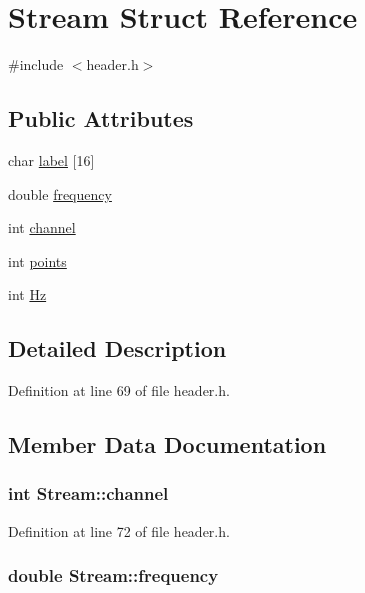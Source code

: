 \hypertarget{structStream}{
\section{Stream Struct Reference}
\label{structStream}
}


{\ttfamily \#include $<$header.h$>$}\subsection*{Public Attributes}
\begin{DoxyCompactItemize}
\item 
char \hyperlink{structStream_af1b6aba00738fd5e20cd47a94ba0386b}{label} \mbox{[}16\mbox{]}
\item 
double \hyperlink{structStream_a4c352f851b0089c569024725a3860e79}{frequency}
\item 
int \hyperlink{structStream_a3e3d54add259a7f6f9ab58e02c7cff72}{channel}
\item 
int \hyperlink{structStream_a02a8da4ea08d8e4784dc5c90f1d87282}{points}
\item 
int \hyperlink{structStream_af36be19d9f235d1f9d9ba5da9db58ae8}{Hz}
\end{DoxyCompactItemize}


\subsection{Detailed Description}


Definition at line 69 of file header.h.

\subsection{Member Data Documentation}
\hypertarget{structStream_a3e3d54add259a7f6f9ab58e02c7cff72}{
\subsubsection[{channel}]{\setlength{\rightskip}{0pt plus 5cm}int {\bf Stream::channel}}}
\label{structStream_a3e3d54add259a7f6f9ab58e02c7cff72}


Definition at line 72 of file header.h.\hypertarget{structStream_a4c352f851b0089c569024725a3860e79}{
\subsubsection[{frequency}]{\setlength{\rightskip}{0pt plus 5cm}double {\bf Stream::frequency}}}
\label{structStream_a4c352f851b0089c569024725a3860e79}


